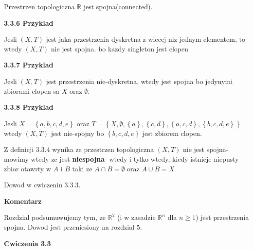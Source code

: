 \documentclass{article}
\begin{document}
\begin{tcolorbox}[colback=white!90!green,colframe=black!35!green,title=3.3.5 Lemat: Spojnosc $\mathbb{R}$]

    Przestrzen topologiczna $\mathbb{R}$ jest spojna(connected).

\end{tcolorbox}

\textbf{3.3.6 Przyklad}

Jesli $(X,T)$ jest jaka przestrzenia dyskretna z wiecej niz jednym elementem, to wtedy  $(X,T)$ nie jest spojna. bo kazdy singleton jest clopen


\textbf{3.3.7 Przyklad}

Jesli $(X,T)$ jest przestrzenia nie-dyskretna, wtedy jest spojna bo jedynymi zbiorami clopen sa $X$ oraz $\emptyset$.

\textbf{3.3.8 Przyklad}

Jesli $X = \left\{ a, b, c, d, e \right\}$ oraz $T = \left\{ X, \emptyset, \left\{ a \right\}, \left\{ c, d \right\}, \left\{ a,c,d \right\}, \left\{ b,c,d,e \right\}    \right\}$ wtedy $(X,T)$ jest nie-spojny bo $ \left\{ b, c, d, e \right\}$ jest zbiorem clopen.

\begin{tcolorbox}[colback=white!90!red,colframe=black!35!red,title=3.3.9 Definicja: Zbior niespojny]

    Z definicji 3.3.4 wynika ze przestrzen topologiczna $(X,T)$ nie jest spojna- mowimy wtedy ze jest \textbf{niespojna}- wtedy i tylko wtedy, kiedy istnieje niepusty zbior otawrty w $A$ i $B$ taki ze $A\cap B = \emptyset \text{ oraz } A\cup B = X$
 
 Dowod w cwiczeniu 3.3.3.
\end{tcolorbox}

\textbf{Komentarz}

Rozdzial podsumuwujemy tym, ze $\mathbb{R}^{2}$ (i w zasadzie $\mathbb{R}^{n}$ dla $n \geq 1$) jest przestrzenia spojna. Dowod jest przeniesiony na rozdzial 5.

\textbf{Cwiczenia 3.3}

\hrulefill
\end{document}
